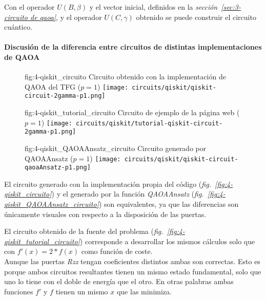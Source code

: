 Con el operador \(U(B, \beta)\) y el vector inicial, definidos en la \textit{sección~\ref{sec:3-circuito de qaoa}}, y el operador \(U(C, \gamma)\) obtenido se puede construir el circuito cuántico.

\paragraph{Discusión de la diferencia entre circuitos de distintas implementaciones de QAOA}

\begin{figure}[Circuito {--} max-cut en grafo de 4 aristas propio]{fig:4-qiskit_circuito}{ Circuito obtenido con la implementación de QAOA del TFG ($p=1$) }
  \centering
  \texttt{[image: circuits/qiskit/qiskit-circuit-2gamma-p1.png]}
\end{figure}

\begin{figure}[Circuito {--} max-cut en grafo de 4 aristas de la fuente]{fig:4-qiskit_tutorial_circuito}{ Circuito de ejemplo de la página web\cite{qiskit_tutorial_antiguo} ($p=1$) }
  \centering
  \texttt{[image: circuits/qiskit/tutorial-qiskit-circuit-2gamma-p1.png]}
\end{figure}

\begin{figure}[Circuito {--} max-cut en grafo de 4 aristas de QAOAAnsatz]{fig:4-qiskit_QAOAAnsatz_circuito}{ Circuito generado por QAOAAnsatz ($p=1$) }
  \centering
  \texttt{[image: circuits/qiskit/qiskit-circuit-qaoaAnsatz-p1.png]}
\end{figure}

El circuito generado con la implementación propia del código (\textit{fig.~\ref{fig:4-qiskit_circuito}}) y el generado por la función \textit{QAOAAnsatz} (\textit{fig.~\ref{fig:4-qiskit_QAOAAnsatz_circuito}}) son equivalentes, ya que las diferencias son únicamente visuales con respecto a la disposición de las puertas.

El circuito obtenido de la fuente del problema (\textit{fig.~\ref{fig:4-qiskit_tutorial_circuito}}) corresponde a desarrollar los mismos cálculos solo que con $f'(x) = 2*f(x)$ como función de coste.
\\
Aunque las puertas \textit{Rzz} tengan coeficientes distintos ambas son correctas.
Esto es porque ambos circuitos resultantes tienen un mismo estado fundamental, solo que uno lo tiene con el doble de energía que el otro.
En otras palabras ambas funciones $f'$ y $f$ tienen un mismo $x$ que las minimiza.


